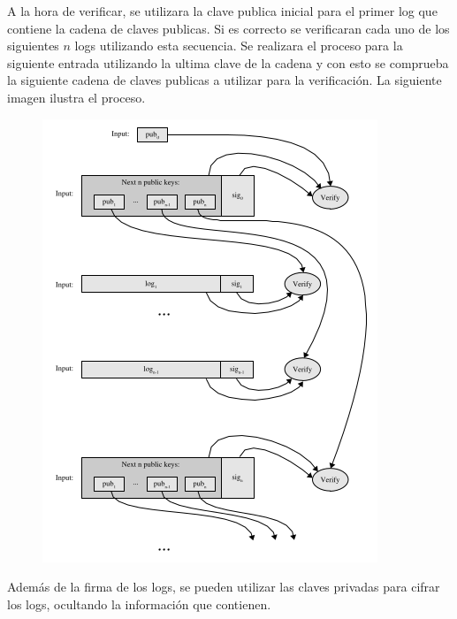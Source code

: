 A la hora de verificar, se utilizara la clave publica inicial para el primer log que contiene la cadena de claves publicas. Si es correcto se verificaran cada uno de los siguientes $n$ logs utilizando esta secuencia. Se realizara el proceso para la siguiente entrada utilizando la ultima clave de la cadena y con esto se comprueba la siguiente cadena de claves publicas a utilizar para la verificación. La siguiente imagen ilustra el proceso.
\begin{figure}[H]
\centering
\includegraphics[scale=0.4]{imagenes/PublicKeyVerification.png}
\end{figure}
  
Además de la firma de los logs, se pueden utilizar las claves privadas para cifrar los logs, ocultando la información que contienen.